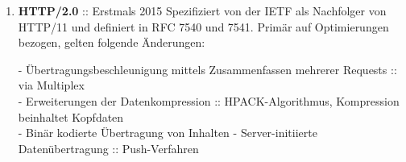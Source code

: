 \documentclass[11pt]{article}
\begin{document}
\begin{enumerate}[\thesection .1]
\begin{enumerate}[$\diamond$]
        \item \textbf{HTTP/2.0} :: Erstmals 2015
        Spezifiziert von der IETF als Nachfolger von HTTP/11 und definiert in RFC 7540 und 7541.
        Primär auf Optimierungen bezogen, gelten folgende Änderungen:
        \begin{addmargin}[1em]{1em}
            - Übertragungsbeschleunigung mittels Zusammenfassen mehrerer Requests :: via Multiplex\\
            - Erweiterungen der Datenkompression :: HPACK-Algorithmus, Kompression beinhaltet Kopfdaten\\
            - Binär kodierte Übertragung von Inhalten
            - Server-initiierte Datenübertragung :: Push-Verfahren\\
        \end{addmargin}


\end{enumerate}
\end{enumerate}
\end{document}
